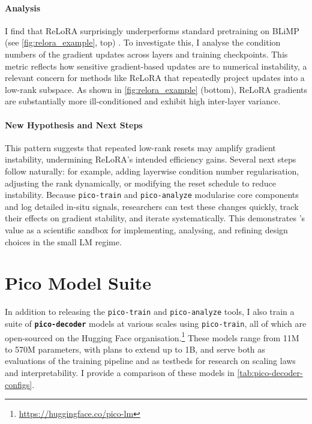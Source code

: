 \paragraph{Analysis} I find that ReLoRA surprisingly underperforms standard pretraining on BLiMP (see \cref{fig:relora_example}, top) \citep{warstadt2020blimp}. To investigate this, I analyse the condition numbers of the gradient updates across layers and training checkpoints. This metric reflects how sensitive gradient-based updates are to numerical instability, a relevant concern for methods like ReLoRA that repeatedly project updates into a low-rank subspace. As shown in \cref{fig:relora_example} (bottom), ReLoRA gradients are substantially more ill-conditioned and exhibit high inter-layer variance. 


\paragraph{New Hypothesis and Next Steps}
This pattern suggests that repeated low-rank resets may amplify gradient instability, undermining ReLoRA's intended efficiency gains. Several next steps follow naturally: for example, adding layerwise condition number regularisation, adjusting the rank dynamically, or modifying the reset schedule to reduce instability. Because \texttt{pico-train} and \texttt{pico-analyze} modularise core components and log detailed in-situ signals, researchers can test these changes quickly, track their effects on gradient stability, and iterate systematically. This demonstrates \pico's value as a scientific sandbox for implementing, analysing, and refining design choices in the small LM regime.


\section{Pico Model Suite}

In addition to releasing the \texttt{pico-train} and \texttt{pico-analyze} tools, I also train a suite of \textbf{\texttt{pico-decoder}} models at various scales using \texttt{pico-train}, all of which are open-sourced on the Hugging Face organisation.\footnote{\url{https://huggingface.co/pico-lm}} These models range from 11M to 570M parameters, with plans to extend up to 1B, and serve both as evaluations of the training pipeline and as testbeds for research on scaling laws and interpretability. I provide a comparison of these models in \cref{tab:pico-decoder-configs}.

